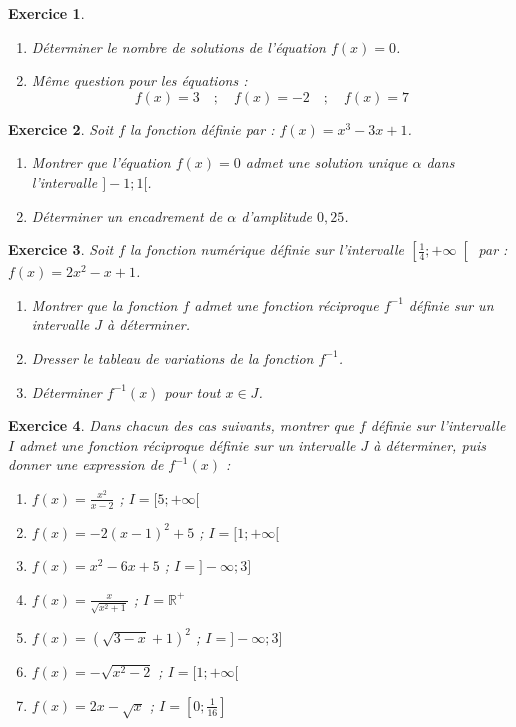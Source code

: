 \documentclass[12pt,a4paper]{article}
\theoremstyle{mystyle}
\newtheorem{exo}{Exercice}
\begin{document}
\begin{multicols*}{2}
\begin{exo}
\begin{enumerate}
            $f(]-\infty; 0])\quad;\quad f([0;2[)\quad;\quad f(]2;+\infty[)\\ f(]-\infty ; 2[)$
            \item Déterminer le nombre de solutions de l'équation $f(x) = 0$.
            \item Même question pour les équations :
            $$f(x) = 3\quad;\quad f(x)=-2\quad;\quad f(x) = 7$$
        \end{enumerate}
\end{exo} 

\begin{exo}
    Soit $f$ la fonction définie par : $f(x) = x^3 - 3x +1$.
    \begin{enumerate}
        \item Montrer que l'équation $f(x) = 0$ admet une solution unique $\alpha$ dans l'intervalle $]-1;1[$.
        \item Déterminer un encadrement de $\alpha$ d'amplitude $0,25$.
    \end{enumerate}
\end{exo}

\begin{exo}
    Soit $f$ la fonction numérique définie sur l'intervalle $\left[\displaystyle\frac{1}{4};+\infty\right[$ par : $f(x) = 2x^2 - x + 1$.
    \begin{enumerate}
        \item Montrer que la fonction $f$ admet une fonction réciproque $f^{-1}$ définie sur un intervalle $J$ à déterminer.
        \item Dresser le tableau de variations de la fonction $f^{-1}$.
        \item Déterminer $f^{-1}(x)$ pour tout $x\in J$.
    \end{enumerate}
\end{exo}

\begin{exo}
Dans chacun des cas suivants, montrer que $f$ définie sur l'intervalle $I$ admet une fonction réciproque définie sur un intervalle $J$ à déterminer, puis donner une expression de $f^{-1}(x)$ :

\begin{enumerate}
    \item $f(x) = \displaystyle\frac{x^2}{x - 2}$ ; \quad $I = [5; +\infty[$
    \item $f(x) = -2(x - 1)^2 + 5$ ; \quad $I = [1; +\infty[$
    \item $f(x) = x^2 - 6x + 5$ ; \quad $I = ]-\infty ; 3]$
    \item $f(x) = \displaystyle\frac{x}{\sqrt{x^2 + 1}}$ ; \quad $I = \mathbb{R}^+$
    \item $f(x) = \left( \sqrt{3 - x }+ 1 \right)^2$ ; \quad $I = ]-\infty ; 3]$
    \item $f(x) = -\sqrt{x^2 - 2}$ ; \quad $I = [1; +\infty[$
    \item $f(x) = 2x - \sqrt{x}$ ; \quad $I = \left[ 0 ; \frac{1}{16} \right]$
\end{enumerate}


\end{exo}
\end{multicols*}
\end{document}
